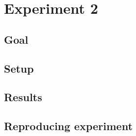 \section{Experiment 2}
\label{sec:exp2}
\subsection{Goal}
\subsection{Setup}
\subsection{Results}
\subsection{Reproducing experiment}
